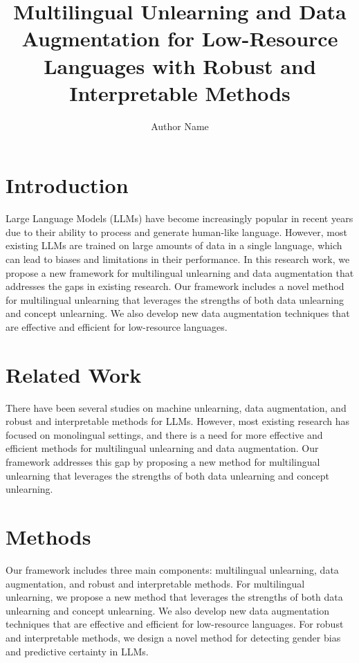 \documentclass{article}
\begin{document}
\title{Multilingual Unlearning and Data Augmentation for Low-Resource Languages with Robust and Interpretable Methods}

\author{Author Name}

\maketitle

\section{Introduction}

Large Language Models (LLMs) have become increasingly popular in recent years due to their ability to process and generate human-like language. However, most existing LLMs are trained on large amounts of data in a single language, which can lead to biases and limitations in their performance. In this research work, we propose a new framework for multilingual unlearning and data augmentation that addresses the gaps in existing research. Our framework includes a novel method for multilingual unlearning that leverages the strengths of both data unlearning and concept unlearning. We also develop new data augmentation techniques that are effective and efficient for low-resource languages.

\section{Related Work}

There have been several studies on machine unlearning, data augmentation, and robust and interpretable methods for LLMs. However, most existing research has focused on monolingual settings, and there is a need for more effective and efficient methods for multilingual unlearning and data augmentation. Our framework addresses this gap by proposing a new method for multilingual unlearning that leverages the strengths of both data unlearning and concept unlearning.

\section{Methods}

Our framework includes three main components: multilingual unlearning, data augmentation, and robust and interpretable methods. For multilingual unlearning, we propose a new method that leverages the strengths of both data unlearning and concept unlearning. We also develop new data augmentation techniques that are effective and efficient for low-resource languages. For robust and interpretable methods, we design a novel method for detecting gender bias and predictive certainty in LLMs.
\end{document}
